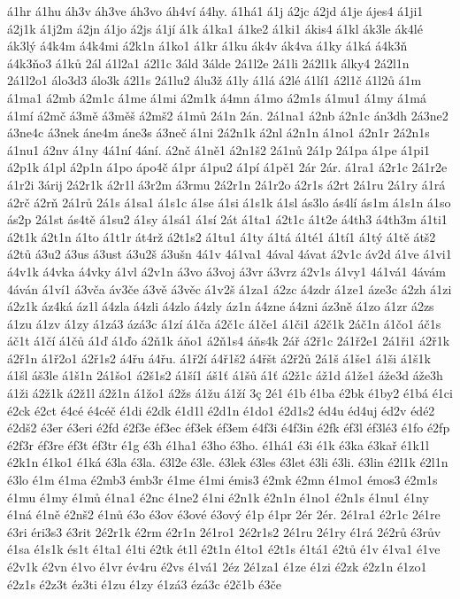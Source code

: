 á1hr
á1hu
áh3v
áh3ve
áh3vo
áh4ví
á4hy.
á1há1
á1j
á2jc
á2jd
á1je
ájes4
á1ji1
á2j1k
á1j2m
á2jn
á1jo
á2js
á1jí
á1k
á1ka1
á1ke2
á1ki1
ákis4
á1kl
ák3le
ák4lé
ák3lý
á4k4m
á4k4mi
á2k1n
á1ko1
á1kr
á1ku
ák4v
ák4va
á1ky
á1ká
á4k3ň
á4k3ňo3
á1ků
2ál
á1l2a1
á2l1c
3áld
3álde
2á1l2e
2á1li
2á2l1k
álky4
2á2l1n
2á1l2o1
álo3d3
álo3k
á2l1s
2á1lu2
álu3ž
á1ly
á1lá
á2lé
á1lí1
á2l1č
á1l2ů
á1m
á1ma1
á2mb
á2m1c
á1me
á1mi
á2m1k
á4mn
á1mo
á2m1s
á1mu1
á1my
á1má
á1mí
á2mč
á3mě
á3měš
á2mš2
á1mů
2á1n
2án.
2á1na1
á2nb
á2n1c
án3dh
2á3ne2
á3ne4c
á3nek
áne4m
áne3s
á3neč
á1ni
2á2n1k
á2nl
á2n1n
á1no1
á2n1r
2á2n1s
á1nu1
á2nv
á1ny
4á1ní
4ání.
á2nč
á1ně1
á2n1š2
2á1nů
2á1p
2á1pa
á1pe
á1pi1
á2p1k
á1pl
á2p1n
á1po
ápo4č
á1pr
á1pu2
á1pí
á1pě1
2ár
2ár.
á1ra1
á2r1c
2á1r2e
á1r2i
3árij
2á2r1k
á2r1l
á3r2m
á3rmu
2á2r1n
2á1r2o
á2r1s
á2rt
2á1ru
2á1ry
á1rá
á2rč
á2rň
2á1rů
2á1s
á1sa1
á1s1c
á1se
á1si
á1s1k
á1sl
ás3lo
ás4lí
ás1m
á1s1n
á1so
ás2p
2á1st
ás4tě
á1su2
á1sy
á1sá1
á1sí
2át
á1ta1
á2t1c
á1t2e
á4th3
á4th3m
á1ti1
á2t1k
á2t1n
á1to
á1t1r
át4rž
á2t1s2
á1tu1
á1ty
á1tá
á1té1
á1tí1
á1tý
á1tě
átš2
á2tů
á3u2
á3us
á3ust
á3u2š
á3ušn
4á1v
4á1va1
4ával
4ávat
á2v1c
áv2d
á1ve
á1vi1
á4v1k
á4vka
á4vky
á1vl
á2v1n
á3vo
á3voj
á3vr
á3vrz
á2v1s
á1vy1
4á1vá1
4ávám
4áván
á1ví1
á3vča
áv3če
á3vě
á3věc
á1v2š
á1za1
á2zc
á4zdr
á1ze1
áze3c
á2zh
á1zi
á2z1k
áz4ká
áz1l
á4zla
á4zli
á4zlo
á4zly
áz1n
á4zne
á4zni
áz3ně
á1zo
á1zr
á2zs
á1zu
á1zv
á1zy
á1zá3
ázá3c
á1zí
á1ča
á2č1c
á1če1
á1či1
á2č1k
2áč1n
á1čo1
áč1s
áč1t
á1čí
á1čů
á1ď
á1ďo
á2ň1k
áňo1
á2ň1s4
áňs4k
2ář
á2ř1c
2á1ř2e1
2á1ři1
á2ř1k
á2ř1n
á1ř2o1
á2ř1s2
á4řu
á4řu.
á1ř2í
á4ř1š2
á4řšt
á2ř2ů
2á1š
á1še1
á1ši
á1š1k
á1šl
áš3le
á1š1n
2á1šo1
á2š1s2
á1ší1
áš1ť
á1šů
á1ť
á2ž1c
áž1d
á1že1
áže3d
áže3h
á1ži
á2ž1k
á2ž1l
á2ž1n
á1žo1
á2žs
á1žu
á1ží
3ç
2é1
é1b
é1ba
é2bk
é1by2
é1bá
é1ci
é2ck
é2ct
é4cé
é4céč
é1di
é2dk
é1d1l
é2d1n
é1do1
é2d1s2
éd4u
éd4uj
éd2v
édé2
é2dš2
é3er
é3eri
é2fd
é2f3e
éf3ec
éf3ek
éf3em
é4f3i
é4f3in
é2fk
éf3l
éf3lé3
é1fo
é2fp
é2f3r
éf3re
éf3t
éf3tr
é1g
é3h
é1ha1
é3ho
é3ho.
é1há1
é3i
é1k
é3ka
é3kař
é1k1l
é2k1n
é1ko1
é1ká
é3la
é3la.
é3l2e
é3le.
é3lek
é3les
é3let
é3li
é3li.
é3lin
é2l1k
é2l1n
é3lo
é1m
é1ma
é2mb3
émb3r
é1me
é1mi
émis3
é2mk
é2mn
é1mo1
émos3
é2m1s
é1mu
é1my
é1mů
é1na1
é2nc
é1ne2
é1ni
é2n1k
é2n1n
é1no1
é2n1s
é1nu1
é1ny
é1ná
é1ně
é2nš2
é1nů
é3o
é3ov
é3ové
é3ový
é1p
é1pr
2ér
2ér.
2é1ra1
é2r1c
2é1re
é3ri
éri3s3
é3rit
2é2r1k
é2rm
é2r1n
2é1ro1
2é2r1s2
2é1ru
2é1ry
é1rá
2é2rů
é3rův
é1sa
é1s1k
és1t
é1ta1
é1ti
é2tk
ét1l
é2t1n
é1to1
é2t1s
é1tá1
é2tů
é1v
é1va1
é1ve
é2v1k
é2vn
é1vo
é1vr
év4ru
é2vs
é1vá1
2éz
2é1za1
é1ze
é1zi
é2zk
é2z1n
é1zo1
é2z1s
é2z3t
éz3ti
é1zu
é1zy
é1zá3
ézá3c
é2č1b
é3če
